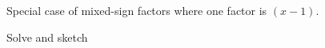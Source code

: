 \documentclass[12pt, a4paper, addpoints]{exam}
\newcommand{\ts}{\vspace{22 mm}}
\newcommand{\ms}{\vspace{33 mm}}
\begin{document}
\begin{questions}
\begin{multicols}{3}
\end{multicols}
\ts

\question Special  case  of mixed-sign  factors where one factor is \((x-1) \). 
\begin{multicols}{3}
\end{multicols}
\ts




\question Solve and sketch 

\begin{multicols}{3}
\end{multicols}
\ts





\end{questions}
\end{document}

